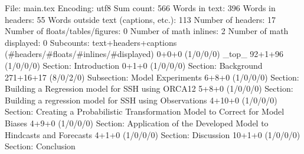 File: main.tex
Encoding: utf8
Sum count: 566
Words in text: 396
Words in headers: 55
Words outside text (captions, etc.): 113
Number of headers: 17
Number of floats/tables/figures: 0
Number of math inlines: 2
Number of math displayed: 0
Subcounts:
  text+headers+captions (#headers/#floats/#inlines/#displayed)
  0+0+0 (1/0/0/0) _top_
  92+1+96 (1/0/0/0) Section: Introduction
  0+1+0 (1/0/0/0) Section: Background
  271+16+17 (8/0/2/0) Subsection: Model Experiments
  6+8+0 (1/0/0/0) Section: Building a Regression model for SSH using ORCA12
  5+8+0 (1/0/0/0) Section: Building a regression model for SSH using Observations
  4+10+0 (1/0/0/0) Section: Creating a Probabilistic Transformation Model to Correct for Model Biases
  4+9+0 (1/0/0/0) Section: Application of the Developed Model to Hindcasts and Forecasts
  4+1+0 (1/0/0/0) Section: Discussion
  10+1+0 (1/0/0/0) Section: Conclusion

